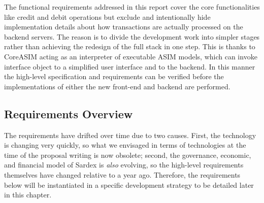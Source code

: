 The functional requirements addressed in this report cover the core functionalities like credit and debit operations but exclude and intentionally hide implementation details about how transactions are actually processed on the backend servers. The reason is to divide the development work into simpler stages rather than achieving the redesign of the full stack in one step. This is thanks to CoreASIM acting as an interpreter of executable ASIM models, which can invoke interface object to a simplified user interface and to the backend. In this manner the high-level specification and requirements can be verified before the implementations of either the new front-end and backend are performed.

\subsection{Requirements Overview}\label{_requirements_overview}
The requirements have drifted over time due to two causes. First, the technology is changing very quickly, so what we envisaged in terms of technologies at the time of the proposal writing is now obsolete; second, the governance, economic, and financial model of Sardex is \emph{also} evolving, so the high-level requirements themselves have changed relative to a year ago. Therefore, the requirements below will be instantiated in a specific development strategy to be detailed later in this chapter.
\setcounter{table}{0}
\setlength{\tabcolsep}{10pt}

